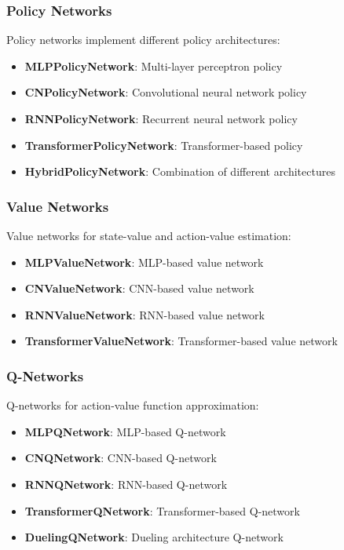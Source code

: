 \subsubsection{Policy Networks}

Policy networks implement different policy architectures:

\begin{itemize}
    \item \textbf{MLPPolicyNetwork}: Multi-layer perceptron policy
    \item \textbf{CNPolicyNetwork}: Convolutional neural network policy
    \item \textbf{RNNPolicyNetwork}: Recurrent neural network policy
    \item \textbf{TransformerPolicyNetwork}: Transformer-based policy
    \item \textbf{HybridPolicyNetwork}: Combination of different architectures
\end{itemize}

\subsubsection{Value Networks}

Value networks for state-value and action-value estimation:

\begin{itemize}
    \item \textbf{MLPValueNetwork}: MLP-based value network
    \item \textbf{CNValueNetwork}: CNN-based value network
    \item \textbf{RNNValueNetwork}: RNN-based value network
    \item \textbf{TransformerValueNetwork}: Transformer-based value network
\end{itemize}

\subsubsection{Q-Networks}

Q-networks for action-value function approximation:

\begin{itemize}
    \item \textbf{MLPQNetwork}: MLP-based Q-network
    \item \textbf{CNQNetwork}: CNN-based Q-network
    \item \textbf{RNNQNetwork}: RNN-based Q-network
    \item \textbf{TransformerQNetwork}: Transformer-based Q-network
    \item \textbf{DuelingQNetwork}: Dueling architecture Q-network
\end{itemize}

